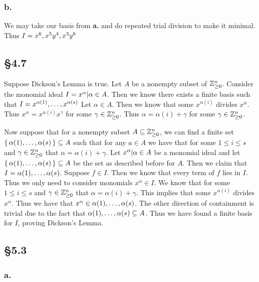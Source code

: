 \documentclass[letterpaper]{article}
\begin{document}
\subsubsection*{b.}

We may take our basis from \textbf{a.} and do repeated trial division to make it minimal. Thus $I = \gen{x^{6}, x^{5}y^{4}, x^{3}y^{6}}$

\subsection*{\S 4.7}

Suppose Dickson's Lemma is true. Let $A$ be a nonempty subset of $\mathbb{Z}_{\geq 0}^{n}$. Consider the monomial ideal $I = \gen{x^{\alpha} | \alpha \in A}$. Then we know there exists a finite basis such that $I = \gen{x^{\alpha(1)}, \ldots, x^{\alpha(s)}}$ Let $\alpha \in A$. Then we know that some $x^{\alpha(i)}$ divides $x^{\alpha}$. Thus $x^{\alpha} = x^{\alpha(i)} x^{\gamma}$ for some $\gamma \in \mathbb{Z}_{\geq 0}^{n}$. Thus $\alpha = \alpha(i) + \gamma$ for some $\gamma \in \mathbb{Z}_{\geq 0}^{n}$.

Now suppose that for a nonempty subset $A \subseteq \mathbb{Z}_{\geq 0}^{n}$, we can find a finite set $\set{\alpha(1), \ldots, \alpha(s)} \subseteq A$ such that for any $a \in A$ we have that for some $1 \leq i \leq s$ and $\gamma \in \mathbb{Z}_{\geq 0}^{n}$ that $\alpha = \alpha(i) + \gamma$. Let $\gen{x^{\alpha} | \alpha \in A}$ be a monomial ideal and let $\set{\alpha(1), \ldots, \alpha(s)} \subseteq A$ be the set as described before for $A$. Then we claim that $I = \gen{\alpha(1), \ldots, \alpha(s)}$. Suppose $f \in I$. Then we know that every term of $f$ lies in $I$. Thus we only need to consider monomials $x^{\alpha} \in I$. We know that for some $1 \leq i \leq s$ and $\gamma \in \mathbb{Z}_{\geq 0}^{n}$ that $\alpha = \alpha(i) + \gamma$. This implies that some $x^{\alpha(i)}$ divides $x^{\alpha}$. Thus we have that $x^{\alpha} \in \gen{\alpha(1), \ldots, \alpha(s)}$. The other direction of containment is trivial due to the fact that $\gen{\alpha(1), \ldots, \alpha(s)} \subseteq A$. Thus we have found a finite basis for $I$, proving Dickson's Lemma.

\subsection*{\S 5.3}

\subsubsection*{a.}
\end{document}
